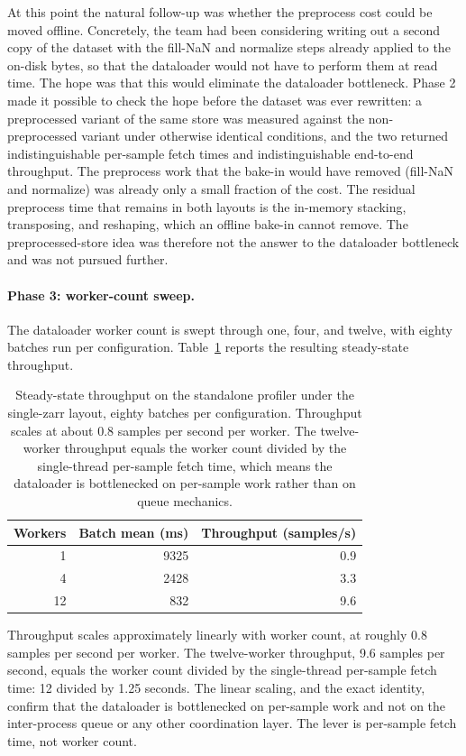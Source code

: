 \documentclass[12pt,a4paper]{article}
\begin{document}
At this point the natural follow-up was whether the preprocess cost could be moved offline.
Concretely, the team had been considering writing out a second copy of the dataset with the
fill-NaN and normalize steps already applied to the on-disk bytes, so that the dataloader
would not have to perform them at read time. The hope was that this would eliminate the
dataloader bottleneck. Phase 2 made it possible to check the hope before the dataset was
ever rewritten: a preprocessed variant of the same store was measured against the
non-preprocessed variant under otherwise identical conditions, and the two returned
indistinguishable per-sample fetch times and indistinguishable end-to-end throughput. The
preprocess work that the bake-in would have removed (fill-NaN and normalize) was already
only a small fraction of the cost. The residual preprocess time that remains in both layouts
is the in-memory stacking, transposing, and reshaping, which an offline bake-in cannot
remove. The preprocessed-store idea was therefore not the answer to the dataloader
bottleneck and was not pursued further.

\paragraph{Phase 3: worker-count sweep.} The dataloader worker count is swept through one,
four, and twelve, with eighty batches run per configuration. Table~\ref{tab:worker-sweep}
reports the resulting steady-state throughput.

\begin{table}[ht]
\centering
\small
\begin{tabular}{@{}rrr@{}}
\toprule
\textbf{Workers} & \textbf{Batch mean (ms)} & \textbf{Throughput (samples/s)} \\
\midrule
 1 & 9325 & 0.9 \\
 4 & 2428 & 3.3 \\
12 &  832 & 9.6 \\
\bottomrule
\end{tabular}
\caption{Steady-state throughput on the standalone profiler under the single-zarr layout,
eighty batches per configuration. Throughput scales at about 0.8 samples per second per
worker. The twelve-worker throughput equals the worker count divided by the single-thread
per-sample fetch time, which means the dataloader is bottlenecked on per-sample work rather
than on queue mechanics.}
\label{tab:worker-sweep}
\end{table}

Throughput scales approximately linearly with worker count, at roughly 0.8 samples per
second per worker. The twelve-worker throughput, 9.6 samples per second, equals the worker
count divided by the single-thread per-sample fetch time: 12 divided by 1.25 seconds. The
linear scaling, and the exact identity, confirm that the dataloader is bottlenecked on
per-sample work and not on the inter-process queue or any other coordination layer. The
lever is per-sample fetch time, not worker count.
\end{document}

